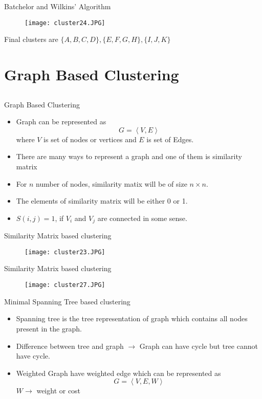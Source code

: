 \begin{frame}{Batchelor and Wilkins' Algorithm}
\begin{figure}
\texttt{[image: cluster24.JPG]}
\end{figure}
Final clusters are $\{A,B,C,D\},\{E,F,G,H\},\{I,J,K\}$
\end{frame}

\section{Graph Based Clustering}
\subsection{}
\begin{frame}{Graph Based Clustering}
\begin{itemize}
\item Graph can be represented as
\begin{equation}
G = \left\langle {V,E} \right\rangle \nonumber
\end{equation}
where $V$ is set of nodes or vertices and $E$ is set of Edges.
\item There are many ways to represent a graph and one of them is similarity matrix
\item For $n$ number of nodes, similarity matix will be of size $n\times n$.
\item The elements of similarity matrix will be either 0 or 1.
\item $S(i,j)=1$, if $V_i$ and $V_j$ are connected in some sense. 
\end{itemize}
\end{frame}


\begin{frame}{Similarity Matrix based clustering}
\begin{figure}
\texttt{[image: cluster23.JPG]}
\end{figure}
\end{frame}

\begin{frame}{Similarity Matrix based clustering}
\begin{figure}
\texttt{[image: cluster27.JPG]}
\end{figure}
\end{frame}

\begin{frame}{Minimal Spanning Tree based clustering}
\begin{itemize}
\item Spanning tree is the tree representation of graph which contains all nodes present in the graph.
\item Difference between tree and graph $\rightarrow$ Graph can have cycle but tree cannot have cycle.
\item Weighted Graph have weighted edge which can be represented as
\begin{equation}
G = \left\langle {V,E,W} \right\rangle \nonumber
\end{equation}
$W\rightarrow$ weight or cost
\end{itemize}
\end{frame}

